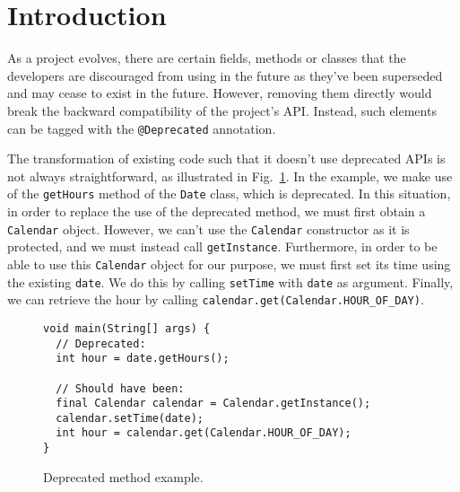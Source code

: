 \documentclass[sigconf,review,anonymous]{acmart}
\begin{document}




\section{Introduction}\label{sec:intro}

As a project evolves, there are certain fields, methods or classes
that the developers are discouraged from using in the future as
they've been superseded and may cease to exist in the future.
However, removing them directly would break the backward compatibility
of the project's API.  Instead, such elements can be tagged with the
\texttt{@Deprecated} annotation.  %


The transformation of existing code such that it doesn't use deprecated APIs
is not always straightforward,
as illustrated in Fig.~\ref{ex:deprecated-method-other}. In the example, we
make use of the \texttt{getHours} method of the \texttt{Date} class,
which is deprecated.
In this situation, in order to replace the use of the deprecated method,
we must first obtain a \texttt{Calendar} object.
However, we can't use the \texttt{Calendar} constructor as it is protected,
and we must instead call \texttt{getInstance}.
Furthermore, in order to be able to use this \texttt{Calendar} object for our purpose,
we must first set its time using the existing \texttt{date}.
We do this by calling \texttt{setTime} with \texttt{date} as argument.
Finally, we can retrieve the hour by calling
\texttt{calendar.get(Calendar.HOUR\_OF\_DAY)}.

\begin{figure}
\begin{lstlisting}[mathescape=true,showstringspaces=false]
void main(String[] args) {
  // Deprecated:
  int hour = date.getHours();
  
  // Should have been:
  final Calendar calendar = Calendar.getInstance();
  calendar.setTime(date);
  int hour = calendar.get(Calendar.HOUR_OF_DAY);
}
\end{lstlisting}
\caption{Deprecated method example.}
\label{ex:deprecated-method-other}
\end{figure}
\end{document}

